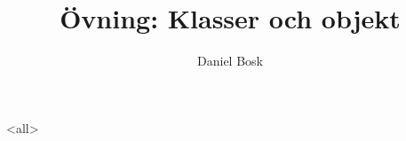 \documentclass[ignoreframetext]{beamer}
\begin{document}
\title{%
  Övning: Klasser och objekt
}
\author{Daniel Bosk}

\begin{frame}
  \maketitle
\end{frame}

\mode<all>

\mode*
\end{document}
